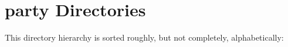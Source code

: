 \section{party Directories}
This directory hierarchy is sorted roughly, but not completely, alphabetically:\begin{CompactList}
\item {}
\end{CompactList}
